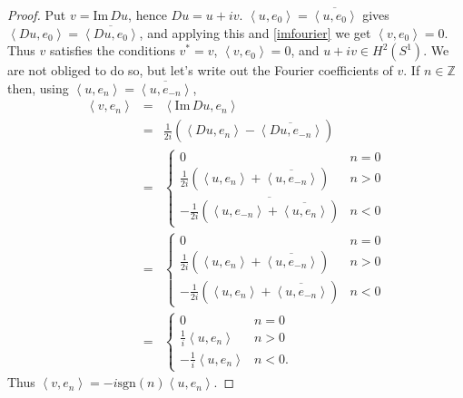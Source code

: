 \documentclass{article}
\newcommand{\inner}[2]{\left\langle #1, #2 \right\rangle}
\def\Im{\ensuremath{\mathrm{Im}}\,}
\newcommand{\sgn}{\textrm{sgn}}
\theoremstyle{definition}
\begin{document}
\begin{proof}
Put $v = \Im Du$, hence $Du=u+iv$. $\inner{u}{e_0}=\overline{\inner{u}{e_0}}$ gives
 $\inner{Du}{e_0}=\overline{\inner{Du}{e_0}}$, and applying this and  
 \eqref{imfourier} we get $\inner{v}{e_0}=0$. Thus $v$ satisfies the conditions $v^*=v$, $\inner{v}{e_0}=0$, and $u+iv \in H^2(S^1)$.
We are not obliged to do so, but let's write out the Fourier coefficients of $v$. 
If $n \in \mathbb{Z}$ then, using $\inner{u}{e_n}=\overline{\inner{u}{e_{-n}}}$,
\begin{eqnarray*}
\inner{v}{e_n}&=& \inner{\Im Du}{e_n}\\
&=&\frac{1}{2i}  \left(  \inner{Du}{e_n} -  \overline{\inner{Du}{e_{-n}}}\right)\\
&=&\begin{cases}
0&n=0\\
\frac{1}{2i}\left( \inner{u}{e_n}+\overline{\inner{u}{e_{-n}}} \right)&n>0\\
-\frac{1}{2i} \overline{\left( \inner{u}{e_{-n}}+\overline{\inner{u}{e_n}} \right)}&n<0 
\end{cases}\\
&=&\begin{cases}
0&n=0\\
\frac{1}{2i}\left( \inner{u}{e_n}+\overline{\inner{u}{e_{-n}}} \right)&n>0\\
-\frac{1}{2i}\left( \inner{u}{e_n}+\overline{\inner{u}{e_{-n}}} \right)&n<0
\end{cases}\\
&=&\begin{cases}
0&n=0\\
\frac{1}{i} \inner{u}{e_n}&n>0\\
-\frac{1}{i} \inner{u}{e_n}&n<0.
\end{cases}
\end{eqnarray*}
Thus $\inner{v}{e_n}=-i\sgn(n) \inner{u}{e_n}$.


\end{proof}
\end{document}
